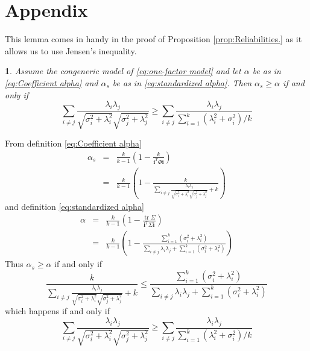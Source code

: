 \documentclass{article}
\makeatletter
\theoremstyle{plain}
\theoremstyle{plain}
\newtheorem{lemma}{\protect\lemmaname}
\theoremstyle{definition}
\theoremstyle{remark}
\theoremstyle{definition}
\theoremstyle{plain}
\theoremstyle{plain}
\theoremstyle{definition}
\newenvironment{proof}[1][\protect\proofname]{\par
	\normalfont\topsep6\p@\@plus6\p@\relax
	\trivlist
	\itemindent\parindent
	\item[\hskip\labelsep\scshape #1]\ignorespaces
}{%
	\endtrivlist\@endpefalse
}
\providecommand{\proofname}{Proof}
\providecommand{\lemmaname}{Lemma}
\DeclareMathOperator{\tr}{tr}
\makeatother
\begin{document}
\section{Appendix}

This lemma comes in handy in the proof of Proposition \ref{prop:Reliabilities.} as it allows us to use Jensen's inequality.

\begin{lemma}
Assume the congeneric model of \eqref{eq:one-factor model} and let $\alpha$ be as in \eqref{eq:Coefficient alpha} and $\alpha_s$ be as in \eqref{eq:standardized alpha}. Then $\alpha_{s}\geq\alpha$
if and only if
\begin{equation}
\label{eq:alpha_s_alpha_inequality}
\sum_{i\neq j}\frac{\lambda_{i}\lambda_{j}}{\sqrt{\sigma_{i}^{2}+\lambda_{i}^{2}}\sqrt{\sigma_j^{2}+\lambda_{j}^{2}}} 
\geq
\sum_{i\neq j}\frac{\lambda_{i}\lambda_{j}}{\sum_{i=1}^{k}\left(\lambda_{i}^{2}+\sigma_{i}^{2}\right)/k}
\end{equation}
\end{lemma}

\begin{proof}
From definition \eqref{eq:Coefficient alpha}
\begin{eqnarray*}
\alpha_{s} & = & \frac{k}{k-1}\left(1-\frac{k}{\mathbf{i}^{T}\Phi\mathbf{i}}\right)\\
 & = & \frac{k}{k-1}\left(1-\frac{k}{\sum_{i\neq j}\frac{\lambda_{i}\lambda_{j}}{\sqrt{\sigma_{i}^{2}+\lambda_{i}^{2}}\sqrt{\sigma_{j}^{2}+\lambda_{j}^{2}}}+k}\right)
\end{eqnarray*}
and definition \eqref{eq:standardized alpha}
\begin{eqnarray*}
\alpha & = & \frac{k}{k-1}\left(1-\frac{\tr\Sigma}{\mathbf{i}^{T}\Sigma\mathbf{i}}\right)\\
 & = & \frac{k}{k-1}\left(1-\frac{\sum_{i=1}^{k}\left(\sigma_{i}^{2}+\lambda_{i}^{2}\right)}{\sum_{i\neq j}\lambda_{i}\lambda_{j}+\sum_{i=1}^{k}\left(\sigma_{i}^{2}+\lambda_{i}^{2}\right)}\right)
\end{eqnarray*}
Thus $\alpha_{s}\geq\alpha$ if and only if
\[
\frac{k}{\sum_{i\neq j}\frac{\lambda_{i}\lambda_{j}}{\sqrt{\sigma_{i}^{2}+\lambda_{i}^{2}}\sqrt{\sigma_{j}^{2}+\lambda_{j}^{2}}}+k}\leq\frac{\sum_{i=1}^{k}\left(\sigma_{i}^{2}+\lambda_{i}^{2}\right)}{\sum_{i\neq j}\lambda_{i}\lambda_{j}+\sum_{i=1}^{k}\left(\sigma_{i}^{2}+\lambda_{i}^{2}\right)}
\]
which happens if and only if 
\[
\sum_{i\neq j}\frac{\lambda_{i}\lambda_{j}}{\sqrt{\sigma_{i}^{2}+\lambda_{i}^{2}}\sqrt{\sigma_j^{2}+\lambda_{j}^{2}}}\geq\sum_{i\neq j}\frac{\lambda_{i}\lambda_{j}}{\sum_{i=1}^{k}\left(\lambda_{i}^{2}+\sigma_{i}^{2}\right)/k}
\]
\end{proof}
\end{document}
